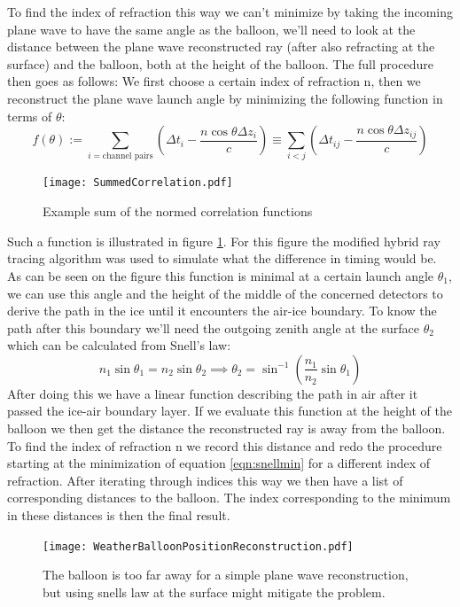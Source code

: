 To find the index of refraction this way we can't minimize by taking the
incoming plane wave to have the same angle as the balloon, we'll need to look
at the distance between the plane wave reconstructed ray (after also refracting
at the surface) and the balloon, both at the height of the balloon.  The full
procedure then goes as follows: We first choose a certain index of refraction n, 
then we reconstruct the plane wave launch angle by minimizing the following function in
terms of $\theta$:
\begin{equation}
	f(\theta) := \sum_{i=\text{channel pairs}}\left( \Delta t_i - \frac{n\cos\theta \Delta z_i}{c}\right) \equiv \sum_{i<j}\left( \Delta t_{ij} - \frac{n\cos\theta \Delta z_{ij}}{c}\right)\label{eqn:snellmin}
\end{equation}
\begin{figure}
	\centering
	\texttt{[image: SummedCorrelation.pdf]}
	\caption{Example sum of the normed correlation functions}
	\label{fig:SummedCorrelation}
\end{figure}
Such a function is illustrated in figure \ref{fig:SummedCorrelation}.  For this
figure the modified hybrid ray tracing algorithm was used to simulate what the
difference in timing would be. 
As can be seen on the figure this function is minimal at a certain launch angle
$\theta_1$, we can use this angle and the height of the middle of the concerned
detectors to derive the path in the ice until it encounters the air-ice
boundary.  To know the path after this boundary we'll need the outgoing zenith
angle at the surface $\theta_2$ which can be calculated from Snell's law:
\begin{equation}
	n_1 \sin{\theta_1} = n_2 \sin{\theta_2} \implies  \theta_2 = \sin^{-1}\left(\frac{n_1}{n_2}\sin{\theta_1}\right)
\end{equation}
After doing this we have a linear function describing the path in air after it
passed the ice-air boundary layer.  If we evaluate this function at the height
of the balloon we then get the distance the reconstructed ray is away from the
balloon.  To find the index of refraction n we record this distance and redo
the procedure starting at the minimization of equation \ref{eqn:snellmin} for a
different index of refraction. After iterating through indices this way
we then have a list of corresponding distances to the balloon. The index
corresponding to the minimum in these distances is then the final result.
\begin{figure}
	\centering
	\texttt{[image: WeatherBalloonPositionReconstruction.pdf]}
	\caption{The balloon is too far away for a simple plane wave reconstruction, but using
  snells law at the surface might mitigate the problem.}
	\label{fig:WeatherBalloonPositionReconstruction}
\end{figure}
